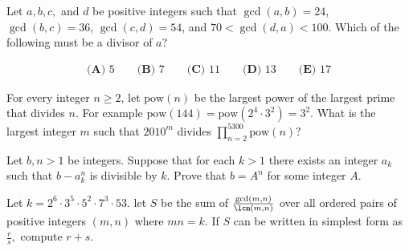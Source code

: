 \documentclass{article}
\begin{document}
\begin{prob}[AMC 10A 2018/22]{9}
Let $a, b, c,$ and $d$ be positive integers such that $\gcd(a, b)=24$, $\gcd(b, c)=36$, $\gcd(c, d)=54$, and $70<\gcd(d, a)<100$. Which of the following must be a divisor of $a$?

\begin{align*}\textbf{(A)} \text{ 5} \qquad \textbf{(B)} \text{ 7} \qquad \textbf{(C)} \text{ 11} \qquad \textbf{(D)} \text{ 13} \qquad \textbf{(E)} \text{ 17}\end{align*}


\end{prob}

\begin{prob}[AMC 12B 2010/25]{9}
For every integer $n\ge2$, let $\text{pow}(n)$ be the largest power of the largest prime that divides $n$. For example $\text{pow}(144)=\text{pow}(2^4\cdot3^2)=3^2$. What is the largest integer $m$ such that $2010^m$ divides $\prod\limits_{n=2}^{5300}\text{pow}(n)?$
\end{prob}

\begin{prob}[ISL 2007/N2]{13}
Let $b,n > 1$ be integers. Suppose that for each $k > 1$ there exists an integer $a_k$ such that $b - a^n_k$ is divisible by $k$. Prove that $b = A^n$ for some integer $A$.
\end{prob}

\begin{prob}[PUMaC 2016]{13}
Let $k=2^6\cdot 3^5\cdot 5^2\cdot 7^3\cdot 53.$ let $S$ be the sum of $\frac{\gcd(m,n)}{\lcm(m,n)}$ over all ordered pairs of positive integers $(m,n)$ where $mn=k.$ If $S$ can be written in simplest form as $\frac{r}{s},$ compute $r+s.$
\end{prob}
\end{document}
